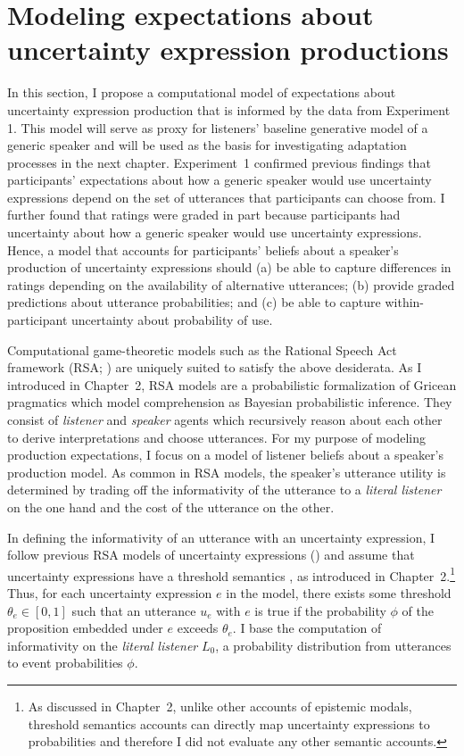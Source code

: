  





\section{Modeling expectations about uncertainty expression productions}
\label{sec:model-baseline}

In this section, I propose a computational model of expectations about uncertainty expression production that is informed by the data from Experiment 1. This model will serve as proxy for listeners' baseline generative model of a generic speaker and will be used as the basis for investigating adaptation processes in the next chapter. Experiment~1 confirmed previous findings that participants' expectations 
about how a generic speaker would use uncertainty expressions 
depend on the set of utterances that participants can choose from.
I further found that ratings were graded in part because participants had uncertainty about how a generic speaker would use uncertainty expressions. 
Hence, a model that accounts for participants' beliefs about a speaker's production of uncertainty expressions
 should  (a) be able to capture differences in ratings depending on the availability of alternative utterances;
(b) provide graded predictions about utterance probabilities; 
and (c) be able to capture within-participant uncertainty about probability of use.

Computational game-theoretic models such as the Rational Speech Act 
framework (RSA; \cite{Goodman2016})  are uniquely suited to satisfy the above desiderata.
As I introduced in Chapter~2, RSA models are a probabilistic formalization of Gricean pragmatics which model comprehension as Bayesian probabilistic inference. 
They consist of \textit{listener} and \textit{speaker} agents which recursively reason about each other to derive interpretations and choose utterances. 
For my purpose of modeling production expectations, I focus on a model of listener beliefs about a speaker's production model.
As common in RSA models, the {speaker}'s utterance utility is determined by trading off the informativity of the utterance to a \textit{literal listener} on the one hand and the cost of the utterance on the other.

In defining the informativity of an utterance with an uncertainty expression, I follow previous RSA models of uncertainty expressions (\cite{Herbstritt2019}) 
and assume that uncertainty expressions have a threshold semantics \cite{Swanson2006,Yalcin2010,Lassiter2016}, as introduced in Chapter~2.\footnote{As discussed in Chapter~2, unlike other accounts of epistemic modals, threshold semantics accounts can directly map uncertainty expressions to probabilities and therefore I did not evaluate any other semantic accounts.} Thus, for each uncertainty expression $e$ in the model, there exists some threshold $\theta_e \in [0,1]$ 
such that an utterance $u_e$ with $e$ is true if the probability $\phi$ 
of the proposition embedded under $e$ exceeds $\theta_e$. 
I base the computation of informativity on the \textit{literal listener} $L_0$,  a probability distribution from utterances to event probabilities $\phi$.

